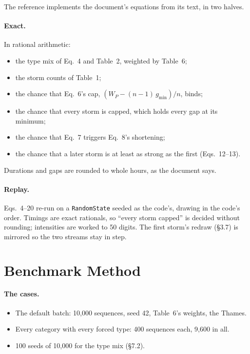 \documentclass[11pt,a4paper]{article}
\begin{document}
\mkmframework

The reference implements the document's equations from its text, in two halves.

\paragraph{Exact.} In rational arithmetic:
\begin{itemize}[leftmargin=*,nosep]
\item the type mix of Eq.~4 and Table~2, weighted by Table~6;
\item the storm counts of Table~1;
\item the chance that Eq.~6's cap, $(W_P - (n-1)\,g_{\min})/n$, binds;
\item the chance that every storm is capped, which holds every gap at its minimum;
\item the chance that Eq.~7 triggers Eq.~8's shortening;
\item the chance that a later storm is at least as strong as the first (Eqs.~12--13).
\end{itemize}
Durations and gaps are rounded to whole hours, as the document says.

\paragraph{Replay.} Eqs.~4--20 re-run on a \texttt{RandomState} seeded as the code's, drawing
in the code's order. Timings are exact rationals, so ``every storm capped'' is decided
without rounding; intensities are worked to 50 digits. The first storm's redraw (\S3.7) is
mirrored so the two streams stay in step.

\section{Benchmark Method}

\paragraph{The cases.}
\begin{itemize}[leftmargin=*,nosep]
\item The default batch: 10{,}000 sequences, seed 42, Table~6's weights, the Thames.
\item Every category with every forced type: 400 sequences each, 9{,}600 in all.
\item 100 seeds of 10{,}000 for the type mix (\S7.2).
\end{itemize}
\end{document}

